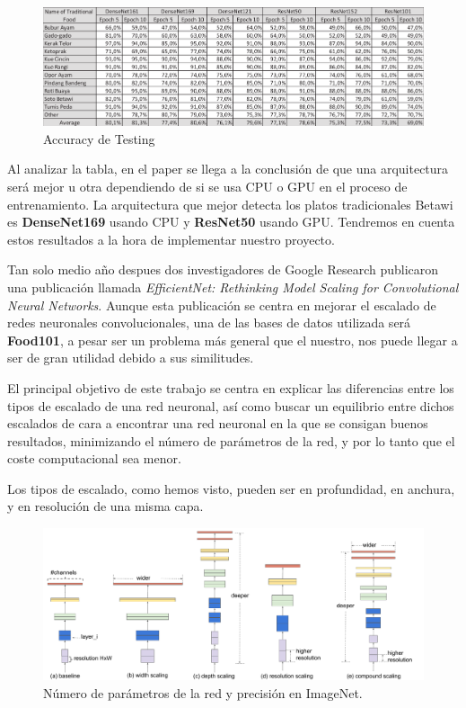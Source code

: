 \vspace{5 mm}

\begin{figure}[H]
  \centering
  \includegraphics[width=1\linewidth]{Imagenes/tablapaper1.png}
  \caption{Accuracy de Testing}
  \label{fig:sub-first}
\end{figure}

\vspace{5 mm}

Al analizar la tabla, en el paper se llega a la conclusión de que una arquitectura será mejor u otra dependiendo de si se usa CPU o GPU en el proceso de entrenamiento. La arquitectura que mejor detecta los platos tradicionales Betawi es \textbf{DenseNet169} usando CPU y \textbf{ResNet50} usando GPU. Tendremos en cuenta estos resultados a la hora de implementar nuestro proyecto.

\newpage

Tan solo medio año despues dos investigadores de Google Research publicaron una publicación llamada \textit{EfficientNet: Rethinking Model Scaling for Convolutional Neural Networks}. Aunque esta publicación se centra en mejorar el escalado de redes neuronales convolucionales, una de las bases de datos utilizada será \textbf{Food101}, a pesar ser un problema más general que el nuestro, nos puede llegar a ser de gran utilidad debido a sus similitudes.

El principal objetivo de este trabajo se centra en explicar las diferencias entre los tipos de escalado de una red neuronal, así como buscar un equilibrio entre dichos escalados de cara a encontrar una red neuronal en la que se consigan buenos resultados, minimizando el número de parámetros de la red, y por lo tanto que el coste computacional sea menor.

Los tipos de escalado, como hemos visto, pueden ser en profundidad, en anchura, y en resolución de una misma capa.


\begin{figure}[H]
  \centering
  \includegraphics[width=1\linewidth]{Imagenes/scalecompare.pdf}
  \caption{Número de parámetros de la red y precisión en ImageNet.}
  \label{fig:param-precision}
\end{figure}


